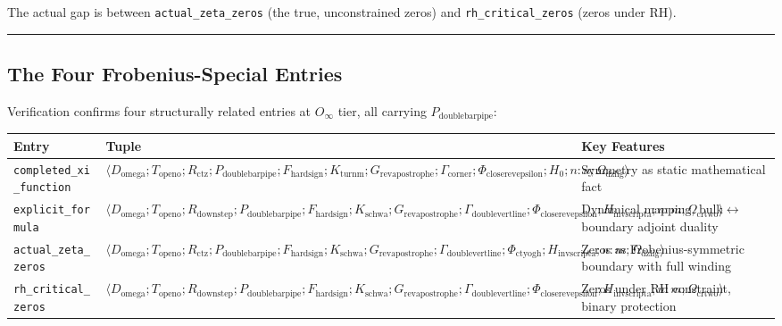 \documentclass[12pt,a4paper]{article}
\begin{document}
The actual gap is between \texttt{actual\_zeta\_zeros} (the true, unconstrained zeros) and \texttt{rh\_critical\_zeros} (zeros under RH).

\begin{center}
\rule{0.5\textwidth}{0.4pt}
\end{center}

\subsection{The Four Frobenius-Special Entries}

Verification confirms four structurally related entries at $O_{\infty}$ tier, all carrying $P_{\text{doublebarpipe}}$:

\begin{table}[htbp]
\centering
\small
{}
\begin{tabularx}{\textwidth}{>{\centering\arraybackslash}X >{\centering\arraybackslash}X >{\centering\arraybackslash}X}
\toprule
\rowcolor{gray!25}\textbf{Entry} & \textbf{Tuple} & \textbf{Key Features} \\
\midrule
\rowcolors{1}{white}{gray!10}
\texttt{completed\_xi\_function} & $\langle D_{\text{omega}}; T_{\text{openo}}; R_{\text{ctz}}; P_{\text{doublebarpipe}}; F_{\text{hardsign}}; K_{\text{turnm}}; G_{\text{revapostrophe}}; \Gamma_{\text{corner}}; \Phi_{\text{closerevepsilon}}; H_0; n{:}n; \Omega_{\text{dzlig}} \rangle$ & Symmetry as static mathematical fact \\
\texttt{explicit\_formula} & $\langle D_{\text{omega}}; T_{\text{openo}}; R_{\text{downstep}}; P_{\text{doublebarpipe}}; F_{\text{hardsign}}; K_{\text{schwa}}; G_{\text{revapostrophe}}; \Gamma_{\text{doublevertline}}; \Phi_{\text{closerevepsilon}}; H_{\text{invscripta}}; n{:}m; \Omega_{\text{crtwo}} \rangle$ & Dynamical mapping, bulk$\leftrightarrow$boundary adjoint duality \\
\texttt{actual\_zeta\_zeros} & $\langle D_{\text{omega}}; T_{\text{openo}}; R_{\text{ctz}}; P_{\text{doublebarpipe}}; F_{\text{hardsign}}; K_{\text{schwa}}; G_{\text{revapostrophe}}; \Gamma_{\text{doublevertline}}; \Phi_{\text{ctyogh}}; H_{\text{invscripta}}; n{:}m; \Omega_{\text{dzlig}} \rangle$ & Zeros as Frobenius-symmetric boundary with full winding \\
\texttt{rh\_critical\_zeros} & $\langle D_{\text{omega}}; T_{\text{openo}}; R_{\text{downstep}}; P_{\text{doublebarpipe}}; F_{\text{hardsign}}; K_{\text{schwa}}; G_{\text{revapostrophe}}; \Gamma_{\text{doublevertline}}; \Phi_{\text{closerevepsilon}}; H_{\text{invscripta}}; n{:}m; \Omega_{\text{crtwo}} \rangle$ & Zeros under RH constraint, binary protection \\
\bottomrule
\end{tabularx}
\end{table}
\end{document}
